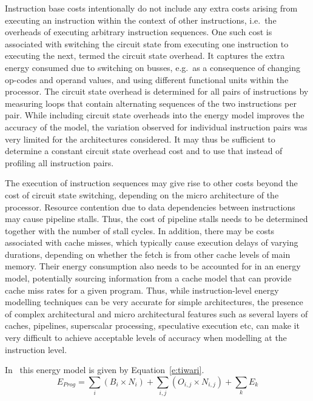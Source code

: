 Instruction base costs intentionally do not include any extra costs arising
from executing an instruction within the context of other instructions, i.e.\
the overheads of executing arbitrary instruction sequences.
%
One such cost is associated with switching the circuit state from executing one
instruction to executing the next, termed the circuit state overhead. It
captures the extra energy consumed due to switching on busses, e.g.\ as a
consequence of changing op-codes and operand values, and using different
functional units within the processor. The circuit state overhead is determined
for all pairs of instructions by measuring loops that contain alternating
sequences of the two instructions per pair.
%
While including circuit state overheads into the energy model improves the
accuracy of the model, the variation observed for individual instruction pairs
was very limited for the architectures considered. It may thus be sufficient to
determine a constant circuit state overhead cost and to use that instead of
profiling all instruction pairs.

The execution of instruction sequences may give rise to other costs beyond the
cost of circuit state switching, depending on the micro architecture of the
processor. Resource contention due to data dependencies between instructions
may cause pipeline stalls. Thus, the cost of pipeline stalls needs to be
determined together with the number of stall cycles.
%
In addition, there may be costs associated with cache misses, which typically
cause execution delays of varying durations, depending on whether the fetch is
from other cache levels of main memory. Their energy consumption also needs to
be accounted for in an energy model, potentially sourcing information from a
cache model that can provide cache miss rates for a given program. 
%
Thus, while instruction-level energy modelling techniques can be very accurate
for simple architectures, the presence of complex architectural and micro
architectural features such as several layers of caches, pipelines, superscalar
processing, speculative execution etc, can make it very difficult to achieve
acceptable levels of accuracy when modelling at the instruction level.

In~\cite{TiwariWolfeInstructionLevelPowerAnalysi:1996} this energy model is
given by Equation~\ref{e:tiwari}.
%
\begin{equation}\label{e:tiwari}
E_{Prog} = \sum_i (B_i \times N_i) + \sum_{i,j} (O_{i,j} \times N_{i,j}) + \sum_k E_k
\end{equation}

